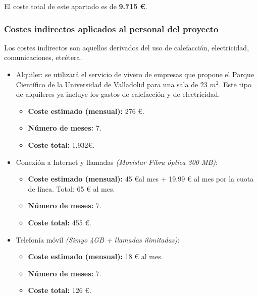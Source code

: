 \documentclass[twoside]{report}
\begin{document}
El coste total de este apartado es de \textbf{9.715 \euro}.

\subsubsection{Costes indirectos aplicados al personal del proyecto}

Los costes indirectos son aquellos derivados del uso de calefacción, electricidad, comunicaciones, etcétera.

\begin{itemize}

\item Alquiler: se utilizará el servicio de vivero de empresas que propone el Parque Científico de la Universidad de Valladolid \cite{pcuva} para una sala de 23 ${m}^{2}$. Este tipo de alquileres ya incluye los gastos de calefacción y de electricidad.
	\begin{itemize}
		\item \textbf{Coste estimado (mensual): } 276 \euro.
		\item \textbf{Número de meses:} 7.
		\item \textbf{Coste total:} 1.932\euro.
	\end{itemize}
	
\item Conexión a Internet y llamadas \textit{(Movistar Fibra óptica 300 MB)}:
	\begin{itemize}
		\item \textbf{Coste estimado (mensual):} 45 \euro \hspace{0.1cm}al mes + 19.99 \euro \hspace{0.1cm} al mes por la cuota de línea. Total: 65 \euro \hspace{0.1cm} al mes.
		\item \textbf{Número de meses:} 7.
		\item \textbf{Coste total:} 455 \euro.
	\end{itemize}
		
\item Telefonía móvil \textit{(Simyo 4GB + llamadas ilimitadas)}:
	\begin{itemize}
		\item \textbf{Coste estimado (mensual):} 18 \euro \hspace{0.1cm} al mes.
		\item \textbf{Número de meses:} 7.
		\item \textbf{Coste total:} 126 \euro.
	\end{itemize}

\end{itemize}
\end{document}
